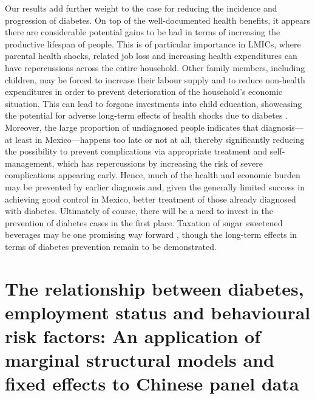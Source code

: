 Our results add further weight to the case for reducing the incidence and progression of diabetes. On top of the well-documented health benefits, it appears there are considerable potential gains to be had in terms of increasing the productive lifespan of people. This is of particular importance in \acp{LMIC}, where parental health shocks, related job loss and increasing health expenditures can have repercussions across the entire household. Other family members, including children, may be forced to increase their labour supply and to reduce non-health expenditures in order to prevent deterioration of the household's economic situation. This can lead to forgone investments into child education, showcasing the potential for adverse long-term effects of health shocks due to diabetes \parencite{Bratti2014}. Moreover, the large proportion of undiagnosed people indicates that diagnosis---at least in Mexico---happens too late or not at all, thereby significantly reducing the possibility to prevent complications via appropriate treatment and self-management, which has repercussions by increasing the risk of severe complications appearing early. Hence, much of the health and economic burden may be prevented by earlier diagnosis and, given the generally limited success in achieving good control in Mexico, better treatment of those already diagnosed with diabetes. Ultimately of course, there will be a need to invest in the prevention of diabetes cases in the first place. Taxation of sugar sweetened beverages may be one promising way forward \parencite{Colchero2016}, though the long-term effects in terms of diabetes prevention remain to be demonstrated.
\DIFdelbegin {}\DIFdelend 







 \newpage 
\acresetall  %
\chapter{\label{cha:China} The relationship between diabetes, employment status and behavioural risk factors: An application of marginal structural models and fixed effects to Chinese panel data}
